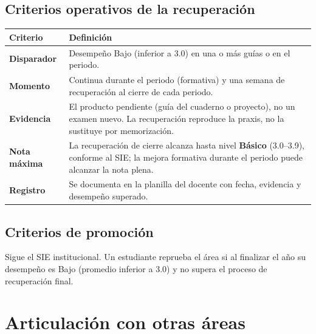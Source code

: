 \documentclass[12pt, a4paper]{article}
\begin{document}
\subsection{Criterios operativos de la recuperación}

\begin{center}
\begin{tabular}{|L{3.5cm}|L{10.5cm}|}
\hline
{}
\color{white}\textbf{Criterio} & \color{white}\textbf{Definición} \\
\hline
\textbf{Disparador} & Desempeño Bajo (inferior a 3.0) en una o más guías o en el periodo. \\
\hline
\textbf{Momento} & Continua durante el periodo (formativa) y una semana de recuperación al cierre de cada periodo. \\
\hline
\textbf{Evidencia} & El producto pendiente (guía del cuaderno o proyecto), no un examen nuevo. La recuperación reproduce la praxis, no la sustituye por memorización. \\
\hline
\textbf{Nota máxima} & La recuperación de cierre alcanza hasta nivel \textbf{Básico} (3.0–3.9), conforme al SIE; la mejora formativa durante el periodo puede alcanzar la nota plena. \\
\hline
\textbf{Registro} & Se documenta en la planilla del docente con fecha, evidencia y desempeño superado. \\
\hline
\end{tabular}
\end{center}

\subsection{Criterios de promoción}

Sigue el SIE institucional. Un estudiante reprueba el área si al finalizar el año su
desempeño es Bajo (promedio inferior a 3.0) y no supera el proceso de recuperación final.

\section{Articulación con otras áreas}
\end{document}
